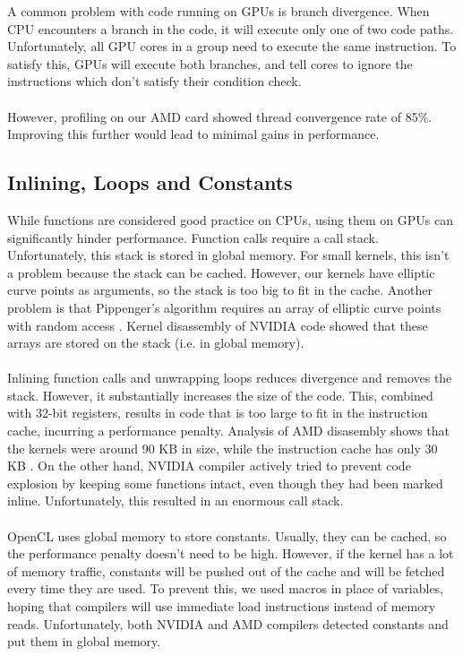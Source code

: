 A common problem with code running on GPUs is branch divergence. When CPU encounters a branch in the code, it will execute only one of two code paths. Unfortunately, all GPU cores in a group need to execute the same instruction. To satisfy this, GPUs will execute both branches, and tell cores to ignore the instructions which don't satisfy their condition check.\\
\\
However, profiling on our AMD card showed thread convergence rate of 85\%. Improving this further would lead to minimal gains in performance.

\subsection{Inlining, Loops and Constants}

While functions are considered good practice on CPUs, using them on GPUs can significantly hinder performance. Function calls require a call stack. Unfortunately, this stack is stored in global memory. For small kernels, this isn't a problem because the stack can be cached. However, our kernels have elliptic curve points as arguments, so the stack is too big to fit in the cache. Another problem is that Pippenger's algorithm requires an array of elliptic curve points with random access \cite{nvidiaarrayindexing}. Kernel disassembly of NVIDIA code showed that these arrays are stored on the stack (i.e. in global memory).\\
\\
Inlining function calls and unwrapping loops reduces divergence and removes the stack. However, it substantially increases the size of the code. This, combined with 32-bit registers, results in code that is too large to fit in the instruction cache, incurring a performance penalty. Analysis of AMD disasembly shows that the kernels were around 90 KB in size, while the instruction cache has only 30 KB \cite{amdgcnarch}. On the other hand, NVIDIA compiler actively tried to prevent code explosion by keeping some functions intact, even though they had been marked inline. Unfortunately, this resulted in an enormous call stack.\\
\\
OpenCL uses global memory to store constants. Usually, they can be cached, so the performance penalty doesn't need to be high. However, if the kernel has a lot of memory traffic, constants will be pushed out of the cache and will be fetched every time they are used. To prevent this, we used macros in place of variables, hoping that compilers will use immediate load instructions instead of memory reads. Unfortunately, both NVIDIA and AMD compilers detected constants and put them in global memory.

